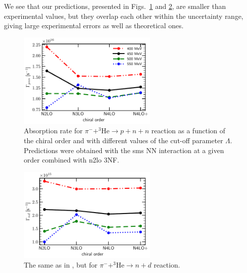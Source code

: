     We see that our predictions, presented in Figs.~\ref{Gamma_pnn} and \ref{Gamma_nd}, are 
    smaller than experimental values, but they overlap each other within the uncertainty range, giving large experimental errors as well as theoretical ones.



    \begin{figure}[h]
        \begin{center}
        \includegraphics[width=0.6\textwidth]{PlotData/PION/Dalitz_maps/figures/Gamma_pnn.pdf}
        \end{center}
        \caption{Absorption rate for $\pi^- + ^3\text{He} \rightarrow p + n + n$ reaction as a function
        of the chiral order and with different values of the cut-off parameter $\Lambda$.
        Predictions were obtained with the \gls{sms} NN interaction at a given order combined
        with \gls{n2lo} 3NF.}
        \label{Gamma_pnn}
    \end{figure}

    \begin{figure}[h]
        \begin{center}
        \includegraphics[width=0.6\textwidth]{PlotData/PION/Dalitz_maps/figures/Gamma_nd.pdf}
        \end{center}
        \caption{The same as in , but for $\pi^- + ^3\text{He} \rightarrow n + d$ reaction.}
        \label{Gamma_nd}
    \end{figure}

